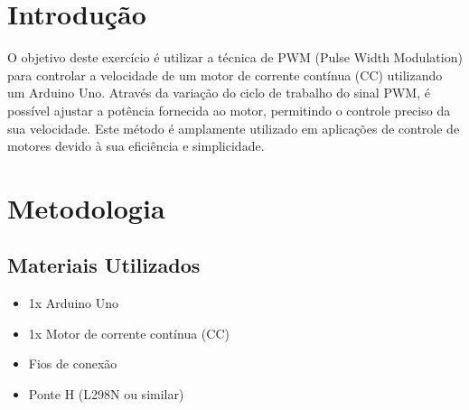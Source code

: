 \documentclass[12pt, a4paper]{article}
\begin{document}
\section{Introdução}
O objetivo deste exercício é utilizar a técnica de PWM (Pulse Width Modulation) para controlar a velocidade de um motor de corrente contínua (CC) utilizando um Arduino Uno. Através da variação do ciclo de trabalho do sinal PWM, é possível ajustar a potência fornecida ao motor, permitindo o controle preciso da sua velocidade. Este método é amplamente utilizado em aplicações de controle de motores devido à sua eficiência e simplicidade.


\newpage

\newpage
\section{Metodologia}
\subsection{Materiais Utilizados}
\begin{itemize}
	\item 1x Arduino Uno
	\item 1x Motor de corrente contínua (CC)
	\item Fios de conexão
	\item Ponte H (L298N ou similar)
\end{itemize}
\end{document}
